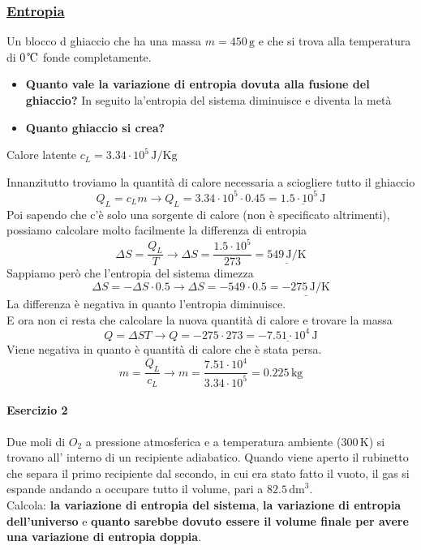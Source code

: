 \subsubsection*{\hyperref[subsec:termodinamica:entropia]{Entropia}}\label{ex:entropia}
Un blocco d ghiaccio che ha una massa $m = 450\,\text{g}$ e che si trova alla temperatura di 
$0\,\text{\textcelsius}$ fonde completamente.
\begin{itemize}
  \item \textbf{Quanto vale la variazione di entropia dovuta alla fusione del ghiaccio?} In seguito 
    la'entropia del sistema diminuisce e diventa la metà
  \item \textbf{Quanto ghiaccio si crea?}
\end{itemize}
Calore latente $c_L = 3.34\cdot10^5\,\text{J/Kg}$
\divisor

Innanzitutto troviamo la quantità di calore necessaria a sciogliere tutto il ghiaccio
\begin{equation*}
  Q_L = c_Lm \rightarrow Q_L = 3.34\cdot10^5\cdot 0.45 = \underline{1.5\cdot10^5\,\text{J}}
\end{equation*}
Poi sapendo che c'è solo una sorgente di calore (non è specificato altrimenti), possiamo calcolare 
molto facilmente la differenza di entropia
\begin{equation*}
  \Delta S = \frac{Q_L}{T} \rightarrow \Delta S = \frac{1.5\cdot10^5}{273} = \underline{549\,\text{J/K}}
\end{equation*}
Sappiamo però che l'entropia del sistema dimezza
\begin{equation*}
  \Delta S = -\Delta S \cdot 0.5 \rightarrow \Delta S = -549 \cdot 0.5 = \underline{-275\,\text{J/K}}
\end{equation*}
La differenza è negativa in quanto l'entropia diminuisce.\\
E ora non ci resta che calcolare la nuova quantità di calore e trovare la massa
\begin{equation*}
  Q = \Delta ST \rightarrow Q = -275\cdot273 = \underline{-7.51\cdot10^4\,\text{J}}
\end{equation*}
Viene negativa in quanto è quantità di calore che è stata persa.
\begin{equation*}
  m = \frac{Q_L}{c_L} \rightarrow m = \frac{7.51\cdot10^4}{3.34\cdot10^5} = \boxed{0.225\,\text{kg}}
\end{equation*}

\paragraph{Esercizio 2}
Due moli di $O_2$ a pressione atmosferica e a temperatura ambiente ($300\,\text{K}$) si trovano all'
interno di un recipiente adiabatico. Quando viene aperto il rubinetto che separa il primo recipiente
dal secondo, in cui era stato fatto il vuoto, il gas si espande andando a occupare tutto il volume, 
pari a $82.5\,\text{dm}^3$.\\
Calcola: \textbf{la variazione di entropia del sistema}, \textbf{la variazione di entropia 
  dell'universo} e \textbf{quanto sarebbe dovuto essere il volume finale per avere una variazione di
entropia doppia}.
\divisor

